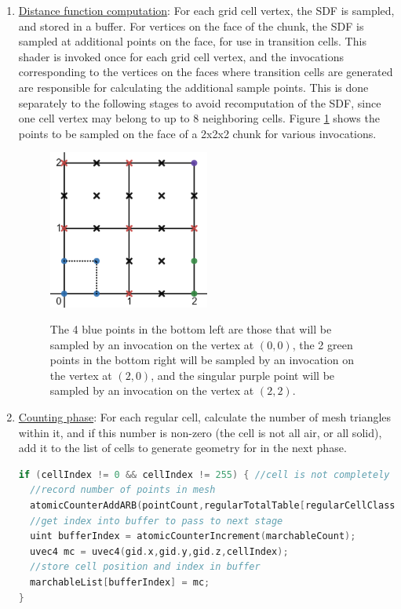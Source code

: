 \documentclass[11pt]{article}
\begin{document}
\begin{enumerate}
\item \underline{Distance function computation}: For each grid cell vertex, the SDF is sampled, and stored in a buffer. For vertices on the face of the chunk, the SDF is sampled at additional points on the face, for use in transition cells. This shader is invoked once for each grid cell vertex, and the invocations corresponding to the vertices on the faces where transition cells are generated are responsible for calculating the additional sample points. This is done separately to the following stages to avoid recomputation of the SDF, since one cell vertex may belong to up to 8 neighboring cells. Figure \ref{fig:tv_gen_grid} shows the points to be sampled on the face of a 2x2x2 chunk for various invocations.

\begin{figure}
  \caption{The 4 blue points in the bottom left are those that will be sampled by an invocation on the vertex at $\left(0,0\right)$, the 2 green points in the bottom right will be sampled by an invocation on the vertex at $\left(2,0\right)$, and the singular purple point will be sampled by an invocation on the vertex at $\left(2,2\right)$.}
  \includegraphics[width=0.5\textwidth]{tv_gen_grid}
  \label{fig:tv_gen_grid}
\end{figure}

\item \underline{Counting phase}: For each regular cell, calculate the number of mesh triangles within it, and if this number is non-zero (the cell is not all air, or all solid), add it to the list of cells to generate geometry for in the next phase. 

\begin{lstlisting}[language=C++,label={tv_count_regular},caption={Code for counting the number of vertices and marchable grid cells in the chunk. \texttt{cellIndex} is calculated according to listing \ref{tv_transition_tables}, using the SDF values from the previous stage.}]
if (cellIndex != 0 && cellIndex != 255) { //cell is not completely solid or air
  //record number of points in mesh
  atomicCounterAddARB(pointCount,regularTotalTable[regularCellClass[cellIndex]]);
  //get index into buffer to pass to next stage
  uint bufferIndex = atomicCounterIncrement(marchableCount);
  uvec4 mc = uvec4(gid.x,gid.y,gid.z,cellIndex);
  //store cell position and index in buffer
  marchableList[bufferIndex] = mc;
}
\end{lstlisting}


\end{enumerate}
\end{document}
